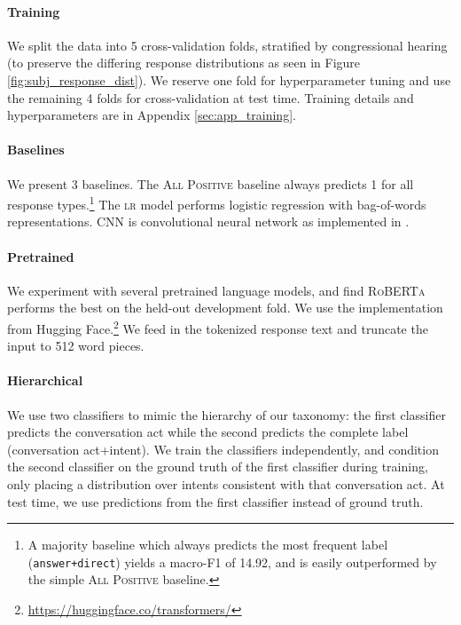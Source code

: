 \paragraph{Training} We split the data into 5 cross-validation folds, stratified by congressional hearing (to preserve the differing response distributions as seen in Figure \ref{fig:subj_response_dist}). We reserve one fold for hyperparameter tuning and use the remaining 4 folds for cross-validation at test time. Training details and hyperparameters are in Appendix \ref{sec:app_training}.

\paragraph{Baselines}
We present 3 baselines. The \textsc{All Positive} baseline always predicts 1 for all response types.\footnote{A majority baseline which always predicts the most frequent label (\texttt{answer+direct}) yields a macro-F1 of 14.92, and is easily outperformed by the simple \textsc{All Positive} baseline.} The \textsc{lr} model performs logistic regression with bag-of-words representations. \textsc{CNN} is convolutional neural network as implemented in .

\paragraph{Pretrained} We experiment with several pretrained language models, and find \textsc{RoBERTa} \cite{Liu:2019} performs the best on the held-out development fold. We use the implementation from Hugging Face.\footnote{\url{https://huggingface.co/transformers/}} We feed in the tokenized response text and truncate the input to 512 word pieces. 

\paragraph{Hierarchical} We use two classifiers to mimic the hierarchy of our taxonomy: the first classifier predicts the conversation act while the second predicts the complete label (conversation act+intent). We train the classifiers independently, and condition the second classifier on the ground truth of the first classifier during training, only placing a distribution over intents consistent with that conversation act. %
At test time, we use predictions from the first classifier instead of  ground truth.

